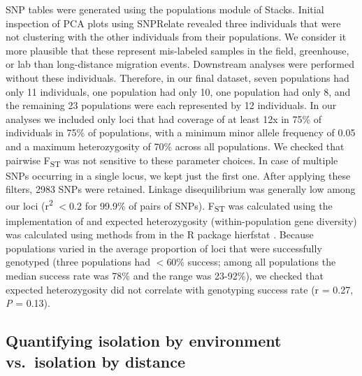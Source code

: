 \documentclass{article}
\begin{document}
SNP tables were generated using the populations module of Stacks. Initial inspection of PCA plots using SNPRelate \citep{zheng2012high} revealed three individuals that were not clustering with the other individuals from their populations. We consider it more plausible that these represent mis-labeled samples in the field, greenhouse, or lab than long-distance migration events. Downstream analyses were performed without these individuals. Therefore, in our final dataset, seven populations had only 11 individuals, one population had only 10, one population had only 8, and the remaining 23 populations were each represented by 12 individuals. In our analyses we included only loci that had coverage of at least 12x in 75\% of individuals in 75\% of populations, with a minimum minor allele frequency of 0.05 and a maximum heterozygosity of 70\% across all populations. We checked that pairwise F\textsubscript{ST} was not sensitive to these parameter choices. In case of multiple SNPs occurring in a single locus, we kept just the first one. After applying these filters, 2983 SNPs were retained. Linkage disequilibrium was generally low among our loci (r\textsuperscript{2} $<$0.2 for 99.9\% of pairs of SNPs). F\textsubscript{ST} was calculated using the implementation of \citet{weir1984estimating} and expected heterozygosity (within-population gene diversity) was calculated using methods from \citet{nei1987molecular} in the R package hierfstat \citep{hierfstat}. Because populations varied in the average proportion of loci that were successfully genotyped (three populations had $<$60\% success; among all populations the median success rate was 78\% and the range was 23-92\%), we checked that expected heterozygosity did not correlate with genotyping success rate (r = 0.27, \textit{P} = 0.13).

\subsection*{Quantifying isolation by environment vs.\ isolation by distance}
\end{document}
